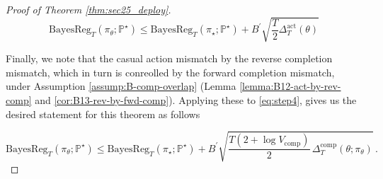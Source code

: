\documentclass[11pt]{article}
\renewcommand{\P}{\mathbb{P}}
\begin{document}
\begin{proof}[Proof of Theorem \ref{thm:sec25_deploy}]
\begin{equation}
\label{eq:step4}
\mathrm{BayesReg}_T(\pi_\theta;\P^\star) \leq \mathrm{BayesReg}_T(\pi_\star;\P^\star) + B^\prime \sqrt{\frac{T}{2} \Delta_{T}^{\mathrm{act}}(\theta)}
\end{equation}

Finally, we note that the casual action mismatch by the reverse completion mismatch, which in turn is conreolled by the forward completion mismatch, under Assumption \ref{assump:B-comp-overlap} (Lemma \ref{lemma:B12-act-by-rev-comp} and \ref{cor:B13-rev-by-fwd-comp}). Applying these to \eqref{eq:step4}, gives us the desired statement for this theorem as follows


\begin{equation*}
\mathrm{BayesReg}_T(\pi_\theta;\P^\star) \leq \mathrm{BayesReg}_T(\pi_\star;\P^\star) + B^\prime \sqrt{\frac{T\left(2+\log V_{\mathrm{comp}}\right)}{2}\,\Delta^{\mathrm{comp}}_{T}(\theta;\pi_\theta)}\,.
\end{equation*}


\end{proof}
\end{document}
